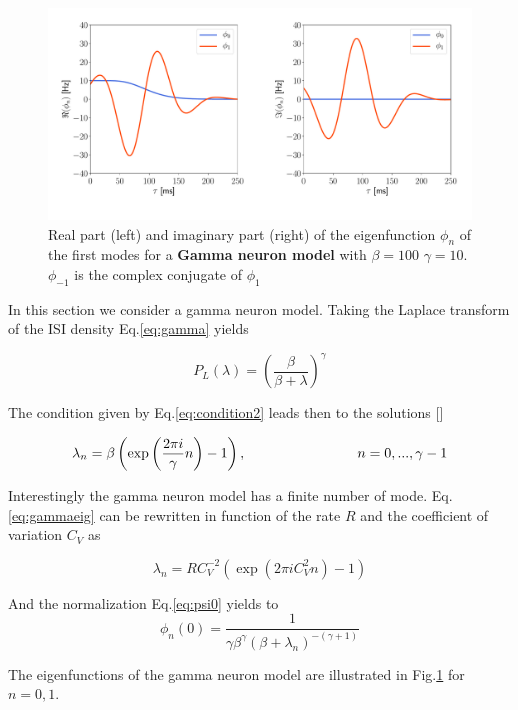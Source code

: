 \documentclass[12pt,twoside]{report}
\begin{document}
\begin{figure}[h!]
	\centering
	\includegraphics[width=0.8\linewidth]{gamma_eigenfunction.pdf}
	\caption{Real part (left) and imaginary part (right) of the eigenfunction $\phi_n$ of the first modes for a \textbf{Gamma neuron model} with $\beta=100$
		$\gamma=10$. $\phi_{-1}$ is the complex conjugate of  $\phi_{1}$}
	\label{fig:gammaeigenfunction}
\end{figure}

In this section we consider a gamma neuron model. Taking the Laplace transform of the ISI density Eq.\eqref{eq:gamma} yields

\begin{equation}
P_L(\lambda)=\left(\frac{\beta}{\beta +\lambda}\right)^\gamma
\end{equation}

The condition given by Eq.\eqref{eq:condition2} leads then to the solutions [\cite{Sch16}]

\begin{equation}
\label{eq:gammaeig}
\lambda_n=\beta\left(\exp\left(\frac{2\pi i}{\gamma}n\right)-1\right), \hspace{2.8cm}  n=0,..., \gamma-1
\end{equation}

Interestingly the gamma neuron model has a finite number of mode. Eq.\eqref{eq:gammaeig} can be rewritten in function of the rate $R$ and the coefficient of variation $C_V$ as

\begin{equation}
\lambda_n=RC_V^{-2}\left(\exp\left(2\pi iC_V^2 n\right)-1\right)
\end{equation}

And the normalization Eq.\eqref{eq:psi0} yields to
\begin{equation}
\phi_n(0)=\frac{1}{\gamma\beta^\gamma(\beta+\lambda_n)^{-(\gamma+1)}}
\end{equation}

The eigenfunctions of the gamma  neuron model are illustrated in Fig.\ref{fig:gammaeigenfunction} for $n=0,1$.
\end{document}

